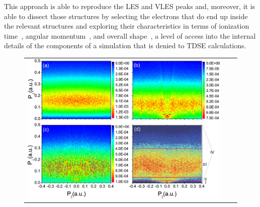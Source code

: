 This approach is able to reproduce the LES and VLES peaks \cite{CTMC1, CTMC2, zhi_Coulomb-LES_2014, lemell_lowenergy_2012} and, moreover, it is able to dissect those structures by selecting the electrons that do end up inside the relevant structures and exploring their characteristics in terms of ionization time~\cite{VLES_characterization, zhi_Coulomb-LES_2014}, angular momentum~\cite{lemell_lowenergy_2012, lemell_classicalquantum_2013}, and overall shape~\cite{lemell_classicalquantum_2013, xia_near-zero-energy_2015}, a level of access into the internal details of the components of a simulation that is denied to TDSE calculations.



\newlength{\figuresixHheight}
\setlength{\figuresixHheight}{5.5cm}
\begin{figure}[hb]
  \centering
  \subfigure{\label{f6-xia-original-figure-a}}
  \subfigure{\label{f6-xia-original-figure-b}}
  \subfigure{\label{f6-xia-original-figure-c}}
  \subfigure{\label{f6-xia-original-figure-d}}
  \subfigure{\label{f6-xia-original-figure-e}}
  \subfigure{\label{f6-xia-original-figure-f}}
  \subfigure{\label{f6-xia-original-figure-g}}
  \subfigure{\label{f6-xia-original-figure-h}}
  \subfigure{\label{f6-xia-original-figure-i}}
  \subfigure{\label{f6-xia-original-figure-j}}
  \subfigure{\label{f6-xia-original-figure-k}}
  \subfigure{\label{f6-xia-original-figure-l}}
  \begin{tabular}{ccc}
  \includegraphics[height=\figuresixHheight]{6-LES/Figures/figure6Ha.png} 
  & \hspace{0mm} &

\end{tabular}
\end{figure}
